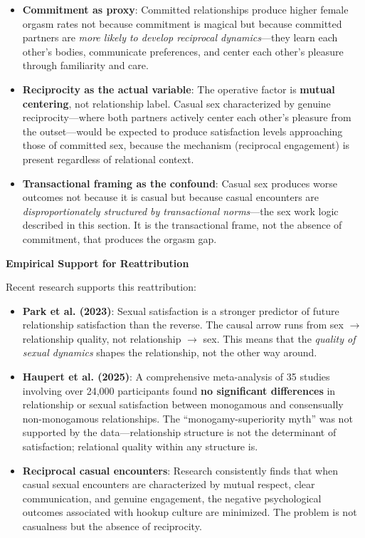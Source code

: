 \documentclass[12pt,openany]{book}
\numberwithin{equation}{chapter}
\begin{document}
\begin{itemize}
    \item \textbf{Commitment as proxy}: Committed relationships produce higher female orgasm rates not because commitment is magical but because committed partners are \textit{more likely to develop reciprocal dynamics}---they learn each other's bodies, communicate preferences, and center each other's pleasure through familiarity and care.
    
    \item \textbf{Reciprocity as the actual variable}: The operative factor is \textbf{mutual centering}, not relationship label. Casual sex characterized by genuine reciprocity---where both partners actively center each other's pleasure from the outset---would be expected to produce satisfaction levels approaching those of committed sex, because the mechanism (reciprocal engagement) is present regardless of relational context.
    
    \item \textbf{Transactional framing as the confound}: Casual sex produces worse outcomes not because it is casual but because casual encounters are \textit{disproportionately structured by transactional norms}---the sex work logic described in this section. It is the transactional frame, not the absence of commitment, that produces the orgasm gap.
\end{itemize}

\textbf{Empirical Support for Reattribution}

Recent research supports this reattribution:

\begin{itemize}
    \item \textbf{Park et al. (2023)}: Sexual satisfaction is a stronger predictor of future relationship satisfaction than the reverse. The causal arrow runs from sex $\rightarrow$ relationship quality, not relationship $\rightarrow$ sex. This means that the \textit{quality of sexual dynamics} shapes the relationship, not the other way around.
    
    \item \textbf{Haupert et al. (2025)}: A comprehensive meta-analysis of 35 studies involving over 24,000 participants found \textbf{no significant differences} in relationship or sexual satisfaction between monogamous and consensually non-monogamous relationships. The ``monogamy-superiority myth'' was not supported by the data---relationship structure is not the determinant of satisfaction; relational quality within any structure is.
    
    \item \textbf{Reciprocal casual encounters}: Research consistently finds that when casual sexual encounters are characterized by mutual respect, clear communication, and genuine engagement, the negative psychological outcomes associated with hookup culture are minimized. The problem is not casualness but the absence of reciprocity.
\end{itemize}
\end{document}
